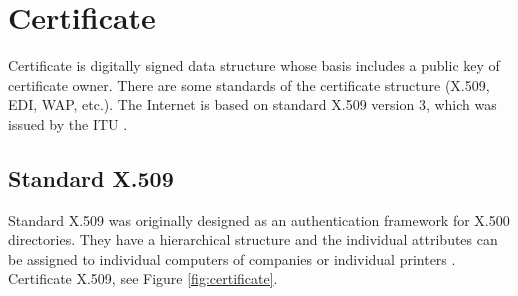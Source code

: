 \documentclass[
  digital, %
  notable,   %
  lof,     %
  lot,     %
]{fithesis3}
\begin{document}
\section{Certificate}
Certificate is digitally signed data structure whose basis includes a public key of
certificate owner. There are some standards of the certificate structure (X.509, EDI, WAP, 
etc.). The Internet is based on standard X.509 version 3, which was issued by the ITU \cite{dostalek2016velky}. %

\subsection{Standard X.509}
Standard X.509 was originally designed as an authentication framework for X.500 
directories. They have a hierarchical structure and the individual attributes can be assigned to 
individual computers of companies or individual printers \cite{schmeh2006cryptography}. %
Certificate X.509, see Figure \ref{fig:certificate}.
\end{document}

